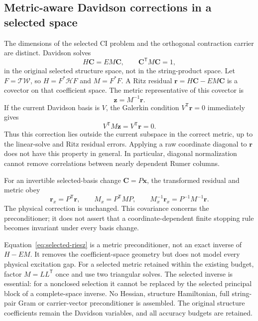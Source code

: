 \documentclass[11pt,a4paper]{article}
\newcommand{\Tr}{^{\mathsf T}}
\newcommand{\Wa}{\mathcal W}
\newcommand{\Ta}{\mathcal T}
\newcommand{\Ha}{\mathcal H}
\renewcommand{\vv}[1]{\mathbf{#1}}
\begin{document}
\subsection{Metric-aware Davidson corrections in a selected space}
\label{sec:selected-ci-metric}

The dimensions of the selected CI problem and the orthogonal contraction
carrier are distinct. Davidson solves
\begin{equation}
 H\vv C=E M\vv C,\qquad \vv C\Tr M\vv C=1,
\end{equation}
in the original selected structure space, not in the string-product space.
Let $F=\Ta\Wa$, so $H=F^*\Ha F$ and $M=F^*F$. A Ritz residual
$\vv r=H\vv C-E M\vv C$ is a covector on that coefficient space.
The metric representative of this covector is
\begin{equation}\label{eq:selected-riesz}
 \vv z=M^{-1}\vv r.
\end{equation}
If the current Davidson basis is $V$, the Galerkin condition
$V\Tr\vv r=0$ immediately gives
\begin{equation}
 V\Tr M\vv z=V\Tr\vv r=0.
\end{equation}
Thus this correction lies outside the current subspace in the correct
metric, up to the linear-solve and Ritz residual errors. Applying a raw
coordinate diagonal to $\vv r$ does not have this property in general.
In particular, diagonal normalization cannot remove correlations between
nearly dependent Rumer columns.

For an invertible selected-basis change $\vv C=P\vv x$, the transformed
residual and metric obey
\begin{equation}
 \vv r_x=P\Tr\vv r,\qquad M_x=P\Tr M P,\qquad
 M_x^{-1}\vv r_x=P^{-1}M^{-1}\vv r.
\end{equation}
The physical correction is unchanged. This covariance concerns the
preconditioner; it does not assert that a coordinate-dependent finite
stopping rule becomes invariant under every basis change.

Equation~\eqref{eq:selected-riesz} is a metric preconditioner, not an exact
inverse of $H-E M$. It removes the coefficient-space geometry but does not
model every physical excitation gap. For a selected metric retained within
the existing budget, factor $M=L L\Tr$ once and use two triangular solves.
The selected inverse is essential: for a nonclosed selection it cannot be
replaced by the selected principal block of a complete-space inverse.
No Hessian, structure Hamiltonian, full string-pair Gram or carrier-vector
preconditioner is assembled. The original structure coefficients remain the
Davidson variables, and all accuracy budgets are retained.
\end{document}
